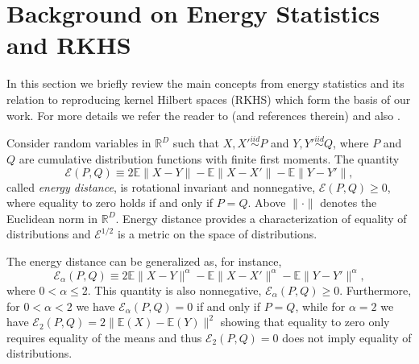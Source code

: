 \documentclass[aps,preprint,nofootinbib,floatfix]{revtex4-1}
\newcommand\Energy{\mathcal{E}}
\newcommand\E{\mathbb{E}}
\begin{document}
\section{Background on Energy Statistics and RKHS}
\label{sec:background}

In this section we briefly review the main concepts from energy
statistics and its relation to reproducing kernel Hilbert spaces 
(RKHS) which form the basis of our work.
For more details we refer the reader
to \cite{Szkely2013} (and references therein) and 
also \cite{Sejdinovic2013}.

Consider random variables in $\mathbb{R}^D$ 
such that $X,X' \stackrel{iid}{\sim} P$ and 
$Y,Y' \stackrel{iid}{\sim} Q$, where $P$ and $Q$ are cumulative
distribution functions with finite first moments. 
The quantity \cite{Szkely2013}
\begin{equation}\label{eq:energy}
\Energy(P, Q) \equiv 2 \E \| X - Y\| - \E \| X - X' \| - \E \| Y - Y' \|,
\end{equation}
called \emph{energy distance}, 
is rotational invariant and nonnegative, $\Energy(P,Q) \ge 0$, where
equality
to zero holds if and only if $P = Q$.
Above $\| \cdot \|$ denotes the
Euclidean norm in $\mathbb{R}^D$. 
Energy distance
provides a characterization of equality of distributions and
$\Energy^{1/2}$ is
a metric on the space of distributions.

The energy distance can be generalized as, for instance,
\begin{equation}\label{eq:energy2}
\Energy_\alpha(P, Q) \equiv 
2 \E \| X - Y\|^{\alpha} - \E \| X - X' \|^{\alpha} - 
\E \| Y - Y' \|^{\alpha},
\end{equation}
where $0<\alpha\le 2$. This quantity is also nonnegative,
$\Energy_\alpha(P,Q) \ge 0$. Furthermore, for $0<\alpha<2$ we have 
$\Energy_\alpha(P,Q) = 0$ if and only if $P=Q$, while for $\alpha=2$ 
we have $\Energy_2(P,Q) = 2\| \E(X) - \E(Y) \|^2$ showing that
equality to zero only requires
equality of the means and thus $\Energy_2(P,Q)=0$ does 
not imply equality of distributions.
\end{document}
